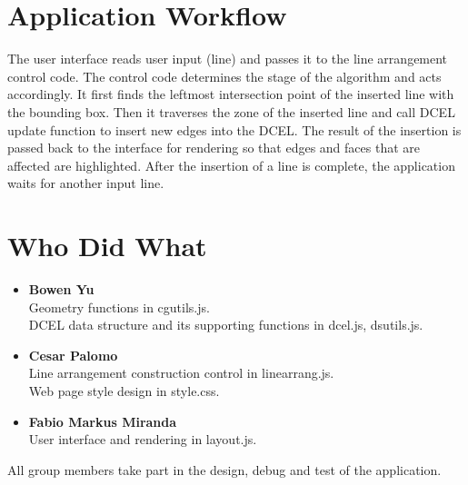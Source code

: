 \documentclass[11pt]{article}
\begin{document}
\section{Application Workflow}
The user interface reads user input (line) and passes it to the line arrangement control code. The control code determines the stage of the algorithm and acts accordingly. It first finds the leftmost intersection point of the inserted line with the bounding box. Then it traverses the zone of the inserted line and call DCEL update function to insert new edges into the DCEL. The result of the insertion is passed back to the interface for rendering so that edges and faces that are affected are highlighted. After the insertion of a line is complete, the application waits for another input line.

\section{Who Did What}
\begin{itemize}
\item {\bf Bowen Yu}\\
Geometry functions in cgutils.js.\\
DCEL data structure and its supporting functions in dcel.js, dsutils.js.
\item {\bf Cesar Palomo}\\
Line arrangement construction control in linearrang.js.\\
Web page style design in style.css.
\item {\bf Fabio Markus Miranda}\\
User interface and rendering in layout.js.\\
\end{itemize}
\noindent* All group members take part in the design, debug and test of the application. 
\end{document}
